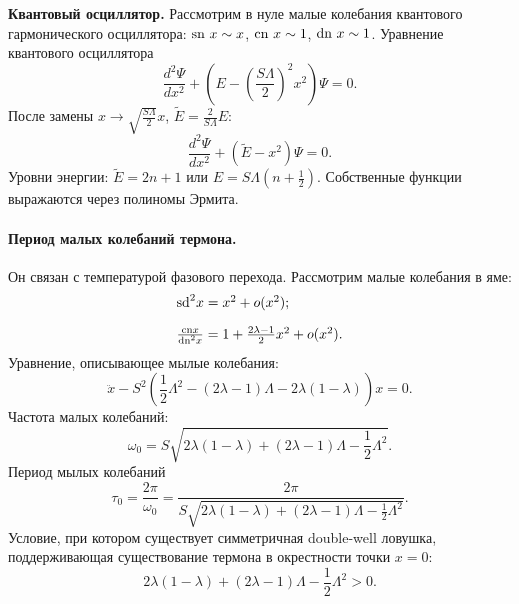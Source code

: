 \documentclass[12pt]{article}
\begin{document}
\textbf{Квантовый осциллятор.}
Рассмотрим в нуле малые колебания квантового гармонического осциллятора: $\textrm{sn}~x \sim x$, $\textrm{cn}~x \sim 1$, $\textrm{dn}~x \sim 1$.
Уравнение квантового осциллятора
%
\begin{equation}
\frac{d^2 \Psi}{dx^2} + (E - \left( \frac{S \Lambda}{2} \right)^2 x^2) \Psi = 0.
\end{equation}
%
После замены $x \to \sqrt{\frac{S \Lambda}{2}} x$, $\tilde{E} = \frac{2}{S \Lambda} E$:
%
\begin{equation}
\frac{d^2 \Psi}{dx^2} + (\tilde{E} - x^2) \Psi = 0.
\end{equation}
%
Уровни энергии: $\tilde{E} = 2n + 1$ или $E = S \Lambda (n + \frac{1}{2})$.
Собственные функции выражаются через полиномы Эрмита.

\paragraph{Период малых колебаний термона.}
Он связан с температурой фазового перехода.
Рассмотрим малые колебания в яме:
%
\begin{equation}
\begin{array}{l}
	\textrm{sd}^2 x = x^2 + o(x^2); \\[10pt]
	\frac{\textrm{cn} x}{\textrm{dn}^2 x} = 1 + \frac{2\lambda - 1}{2} x^2 + o(x^2).
\end{array}
\end{equation}
%
Уравнение, описывающее мылые колебания:
%
\begin{equation}
\ddot{x} - S^2 \left( \frac{1}{2} \Lambda^2 - (2\lambda - 1)\Lambda - 2 \lambda (1 - \lambda) \right) x = 0.
\end{equation}
%
Частота малых колебаний:
%
\begin{equation}
\omega_0 = S \sqrt{2 \lambda (1 - \lambda) + (2\lambda - 1)\Lambda - \frac{1}{2} \Lambda^2}.
\end{equation}
%
Период мылых колебаний
%
\begin{equation}
\tau_0 = \frac{2 \pi}{\omega_0} = \frac{2 \pi}{S \sqrt{2 \lambda (1 - \lambda) + (2\lambda - 1)\Lambda - \frac{1}{2} \Lambda^2}}.
\end{equation}
%
Условие, при котором существует симметричная double-well ловушка, поддерживающая существование термона в окрестности точки $x = 0$:
%
\begin{equation}
2 \lambda (1 - \lambda) + (2\lambda - 1)\Lambda - \frac{1}{2} \Lambda^2 > 0.
\end{equation}
%
\end{document}
